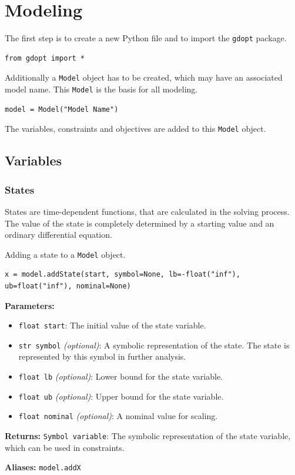 \documentclass[12pt]{article}
\begin{document}
\section{Modeling}

The first step is to create a new Python file and to import the
\texttt{gdopt} package.
\begin{lstlisting}
from gdopt import *
	\end{lstlisting}

Additionally a \texttt{Model} object has to be created, which may have an associated model name. This
\texttt{Model} is the basis for all modeling.
\begin{lstlisting}
model = Model("Model Name")
	\end{lstlisting}

The variables, constraints and objectives are added to this
\texttt{Model} object.

\subsection{Variables}

\subsubsection{States}

States are time-dependent functions, that are calculated in the
solving process. The value of the state is completely determined by a starting
value and an ordinary differential equation.

\begin{mdframed}[backgroundcolor=gray!10, roundcorner=10pt, linewidth=1pt]

	Adding a state to a \texttt{Model} object.

	\begin{lstlisting}
x = model.addState(start, symbol=None, lb=-float("inf"), ub=float("inf"), nominal=None)
	\end{lstlisting}\label{addState}

	\textbf{Parameters:}
	\begin{itemize}
		\item \texttt{float start}: The initial value of the state
		      variable.
		\item \texttt{str symbol} \emph{(optional)}: A symbolic
		      representation of the state. The state is
		      represented by this symbol in
		      further analysis.
		\item \texttt{float lb} \emph{(optional)}: Lower bound for the
		      state variable.
		\item \texttt{float ub} \emph{(optional)}: Upper bound for the
		      state variable.
		\item \texttt{float nominal} \emph{(optional)}: A nominal value
		      for scaling.
	\end{itemize}

	\textbf{Returns:}
	\texttt{Symbol variable}: The symbolic representation of the state
	variable, which can be used in constraints.

	\textbf{Aliases:} \texttt{model.addX}
\end{mdframed}
\end{document}
